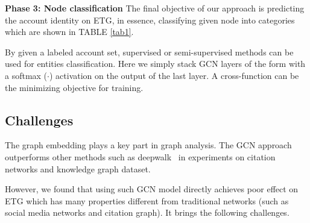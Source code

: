 





\textbf{Phase 3: Node classification}
The final objective of our approach is predicting the account identity on ETG, in essence, classifying given node into categories which are shown in TABLE \ref{tab1}.

By given a labeled account set, supervised or semi-supervised methods can be used for entities classification. Here we simply stack GCN layers of the form with a softmax ($\cdot$) activation on the output of the last layer. A cross-function can be the minimizing objective for training.

\subsection{Challenges}
\label{section:time}
The graph embedding plays a key part in graph analysis. The GCN approach \cite{kipf2016semi} outperforms other methods such as deepwalk~\cite{perozzi2014deepwalk} in experiments on citation networks and knowledge graph dataset.

However, we found that using such GCN model directly achieves poor effect on ETG which has many properties different from traditional networks (such as social media networks and citation graph). It brings the following challenges.


